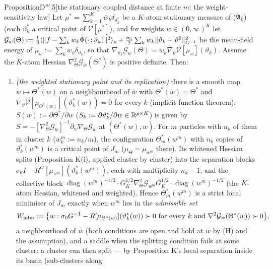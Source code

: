 \begin{thm}{Proposition}{D$'''$.5}[the stationary coupled distance at finite $m$: the weight-sensitivity law]
Let $\mu^* = \sum_{k=1}^K\bar w_k\delta_{\vartheta^*_k}$ be a $K$-atom stationary measure of
\textup{($\mathfrak{A}_0$)} (each $\vartheta^*_k$ a critical point of $\mathcal{V}[\mu^*]$), and for weights
$w\in(0,\infty)^K$ let $\mathcal{G}_w(\Theta) := \frac12\langle\lVert f - \sum_kw_k\tilde\Phi(\cdot\,;\vartheta_k)\rVert^2\rangle_\rho
+ \frac{\sigma_0}2\sum_kw_k\lVert \vartheta_k - \vartheta^0\rVert^2_{G^{-1}}$ be the mean-field energy of
$\mu_w := \sum_kw_k\delta_{\vartheta_k}$, so that $\nabla_{\vartheta_k}\mathcal{G}_w(\Theta) = w_k\nabla_\vartheta\mathcal{V}[\mu_w](\vartheta_k)$.
Assume the $K$-atom Hessian $\nabla^2_\Theta\mathcal{G}_{\bar w}(\Theta^*)$ is positive definite. Then:
\begin{enumerate}[label=\textup{(\roman*)}]
  \item \emph{(the weighted stationary point and its replication)} there is a smooth map $w\mapsto\Theta^*(w)$ on a
    neighbourhood of $\bar w$ with $\Theta^*(\bar w) = \Theta^*$ and
    $\nabla_\vartheta\mathcal{V}[\mu_{\Theta^*(w)}](\vartheta^*_k(w)) = 0$ for every $k$ (implicit function theorem);
    $S(w) := \partial\Theta^*/\partial w$ ($S_k := \partial\vartheta^*_k/\partial w\in\mathbb{R}^{p\times K}$) is given by
    $S = -[\nabla^2_\Theta\mathcal{G}_w]^{-1}\partial_w\nabla_\Theta\mathcal{G}_w$ at $(\Theta^*(w),w)$. For $m$
    particles with $n_k$ of them in cluster $k$ ($w^m_k := n_k/m$), the configuration $\Theta^*_m(w^m)$ with $n_k$
    copies of $\vartheta^*_k(w^m)$ is a critical point of $J_m$ ($\mu_\Theta = \mu_{w^m}$ there). Its whitened
    Hessian splits (Proposition K(i), applied cluster by cluster) into the separation blocks
    $\sigma_0I - R^G[\mu_{w^m}](\vartheta^*_k(w^m))$, each with multiplicity $n_k - 1$, and the collective block
    $\operatorname{diag}(w^m)^{-1/2}\cdot G_K^{1/2}\nabla^2_\Theta\mathcal{G}_{w^m}G_K^{1/2}\cdot\operatorname{diag}(w^m)^{-1/2}$
    (the $K$-atom Hessian, whitened and weighted). Hence $\Theta^*_m(w^m)$ is a strict local minimiser of $J_m$
    exactly when $w^m$ lies in the \emph{admissible set}
    \[
      W_{\mathrm{adm}} := \bigl\{w : \sigma_0G^{-1} - R[\mu_{\Theta^*(w)}](\vartheta^*_k(w))\succ0\text{ for every }k
      \text{ and }\nabla^2\mathcal{G}_w(\Theta^*(w))\succ0\bigr\},
    \]
    a neighbourhood of $\bar w$ (both conditions are open and hold at $\bar w$ by (H) and the assumption), and a
    saddle when the splitting condition fails at some cluster: a cluster can then split --- by Proposition K's local separation inside its basin (sub-clusters along

\end{enumerate}
\end{thm}
